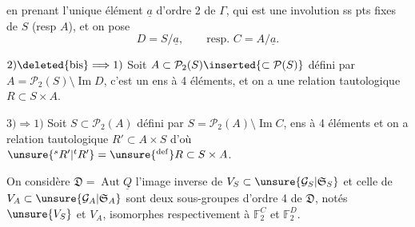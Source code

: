 en prenant l'unique élément $\underline{a}$ d'ordre 2 de $\Gamma$,
qui est une involution ss pts fixes de $S$ (resp $A$), et on pose
\[
D=S/\underline{a},\qquad\text{resp. }C=A/\underline{a}.
\]

$2)\deleted{\mathrm{bis}}\Longrightarrow1)$
Soit $A\subset\mathcal{P}_2(S)\inserted{\subset\mathcal{P}(S)}$ défini par
$A=\mathcal{P}_2(S)\setminus\operatorname{Im}D$,
c'est un ens à 4 éléments,  et on a une relation tautologique
$R\subset S\times A$.

$3)\Longrightarrow1)$
Soit $S\subset\mathcal{P}_2(A)$ défini par
$S=\mathcal{P}_2(A)\setminus\operatorname{Im}C$,
ens à 4 éléments et on a relation tautologique $R'\subset A\times S$ d'où
$\unsure{{}^{s}R'|{}^{t}R'}=\unsure{{}^{\mathrm{def}}}R\subset S\times A$.

On considère $\mathfrak{D}=\operatorname{Aut}\underline{Q}$
l'image inverse de $V_S\subset\unsure{\mathcal{G}_S|\mathfrak{S}_S}$ et celle de
$V_A\subset\unsure{\mathcal{G}_A|\mathfrak{S}_A}$ sont deux sous-groupes d'ordre 4
 de $\mathfrak{D}$, notés
$\unsure{V_S}$ et $V_A$, isomorphes respectivement à
$\mathbb{F}_2^C$ et $\mathbb{F}_2^D$.


